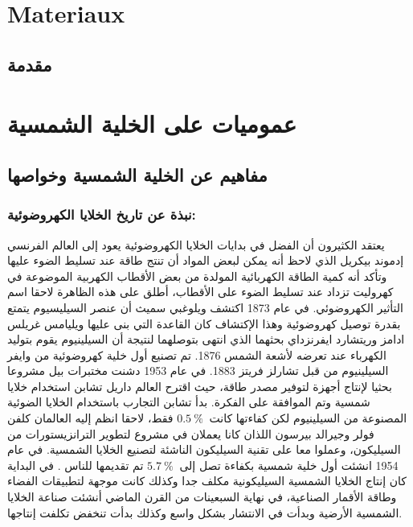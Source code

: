\chapter{Materiaux} %

\label{Chapter1} %

\section*{مقدمة}


\chapter{عموميات على الخلية الشمسية}

\section {مفاهيم عن الخلية الشمسية وخواصها }
\subsection{نبذة عن تاريخ الخلايا الكهروضوئية:}
يعتقد الكثيرون أن الفضل في بدايات الخلايا الكهروضوئية يعود إلى العالم الفرنسي إدموند بيكريل الذي لاحظ أنه يمكن لبعض المواد أن تنتج طاقة عند تسليط الضوء عليها وتأكد أنه كمية الطاقة الكهربائية المولدة من بعض الأقطاب الكهربية الموضوعة في كهروليت تزداد عند تسليط الضوء على الأقطاب، أطلق على هذه الظاهرة لاحقا اسم التأثير الكهروضوئي.
في عام 1873 اكتشف ويلوغبي سميث أن عنصر السيليسيوم يتمتع بقدرة توصيل كهروضوئية وهذا الإكتشاف كان القاعدة التي بنى عليها ويليامس غريلس ادامز وريتشارد ايفرنزداي بحثهما الذي انتهى بتوصلهما لنتيجة أن السيلينيوم يقوم بتوليد الكهرباء عند تعرضه لأشعة الشمس 1876. تم تصنيع أول خلية كهروضوئية من وايفر السيلينيوم من قبل تشارلز فريتز 1883.
في عام 1953 دشنت مختبرات بيل مشروعا بحثيا لإنتاج أجهزة لتوفير مصدر طاقة، حيث اقترح العالم داريل تشابن استخدام خلايا شمسية وتم الموافقة على الفكرة. بدأ تشابن التجارب باستخدام الخلايا الضوئية المصنوعة من السيلينيوم لكن كفاءتها كانت $ 0.5~\%~   $ فقط، لاحقا انظم إليه العالمان كلفن فولر وجيرالد بيرسون اللذان كانا يعملان في مشروع لتطوير الترانزيستورات من السيليكون، وعملوا معا على تقنية السيليكون الناشئة لتصنيع الخلايا الشمسية. في عام 1954  انشئت أول خلية شمسية بكفاءة تصل إلى $ 5.7~\%~   $  تم تقديمها للناس \cite{a1}.
في البداية كان إنتاج الخلايا الشمسية السيليكونية مكلف جدا وكذلك كانت موجهة لتطبيقات الفضاء وطاقة الأقمار الصناعية، في نهاية السبعينات من القرن الماضي أنشئت صناعة الخلايا الشمسية الأرضية وبدأت في الانتشار بشكل واسع وكذلك بدأت تنخفض تكلفت إنتاجها.
